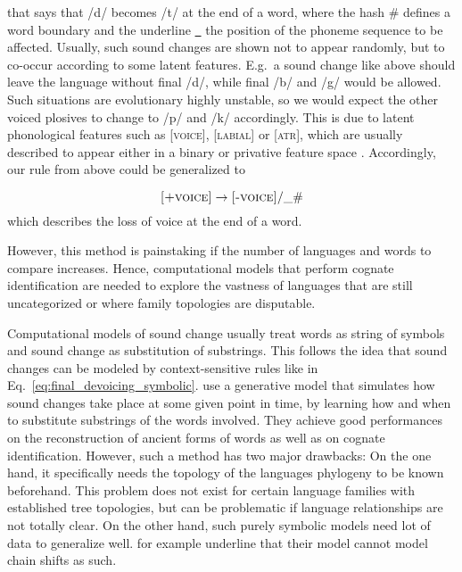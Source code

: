 \documentclass[6pt]{article}
\begin{document}
\noindent that says that /d/ becomes /t/ at the end of a word, where the hash \# defines a word boundary and the underline \underline{\ } the position of the phoneme sequence to be affected. Usually, such sound changes are shown not to appear randomly, but to co-occur according to some latent features. E.g.\ a sound change like above should leave the language without final /d/, while final /b/ and /g/ would be allowed. Such situations are evolutionary highly unstable, so we would expect the other voiced plosives to change to /p/ and /k/ accordingly. This is due to latent phonological features such as \textsc{[voice]}, \textsc{[labial]} or \textsc{[atr]}, which are usually described to appear either in a binary or privative feature space \citep{chomsky1968sound}. Accordingly, our rule from above could be generalized to

\begin{equation}
\textsc{[+voice]} \rightarrow \textsc{[-voice]} / \_ \#
\label{eq:final_devoicing}
\end{equation}
which describes the loss of voice at the end of a word.

However, this method is painstaking if the number of languages and words to compare increases. Hence, computational models that perform cognate identification are needed to explore the vastness of languages that are still uncategorized or where family topologies are disputable.

Computational models of sound change usually treat words as string of symbols and sound change as substitution of substrings. This follows the idea that sound changes can be modeled by context-sensitive rules like in Eq.~\ref{eq:final_devoicing_symbolic}. \cite{bouchard2007probabilistic,bouchard2013automated} use a generative model that simulates how sound changes take place at some given point in time, by learning how and when to substitute substrings of the words involved. They achieve good performances on the reconstruction of ancient forms of words as well as on cognate identification. However, such a method has two major drawbacks: On the one hand, it specifically needs the topology of the languages phylogeny to be known beforehand. This problem does not exist for certain language families with established tree topologies, but can be problematic if language relationships are not totally clear. On the other hand, such purely symbolic models need lot of data to generalize well. \cite{bouchard2007probabilistic} for example underline that their model cannot model chain shifts as such. 
\end{document}
